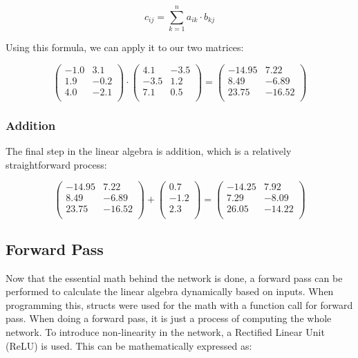 \[
c_{ij} = \sum_{k=1}^{n} a_{ik} \cdot b_{kj}
\]

Using this formula, we can apply it to our two matrices:

\[
\begin{pmatrix}
    -1.0 & 3.1 \\
    1.9 & -0.2 \\
    4.0 & -2.1 \\
\end{pmatrix}
\cdot
\begin{pmatrix}
    4.1 & -3.5\\
    -3.5 & 1.2\\
    7.1 & 0.5\\
\end{pmatrix}
=
\begin{pmatrix}
    -14.95 & 7.22\\
    8.49 & -6.89\\
    23.75 & -16.52\\
\end{pmatrix}
\]

\subsubsection*{Addition}

The final step in the linear algebra is addition, which is a relatively straightforward process:

\[
\begin{pmatrix}
    -14.95 & 7.22\\
    8.49 & -6.89\\
    23.75 & -16.52\\
\end{pmatrix}
+
\begin{pmatrix}
    0.7\\
    -1.2\\
    2.3\\
\end{pmatrix}
=
\begin{pmatrix}
    -14.25 & 7.92\\
    7.29 & -8.09\\
    26.05 & -14.22\\
\end{pmatrix}
\]

\subsection*{Forward Pass}

Now that the essential math behind the network is done, a forward pass can be performed to calculate the linear algebra dynamically based on inputs. When programming this, structs were used for the math with a function call for forward pass. When doing a forward pass, it is just a process of computing the whole network. To introduce non-linearity in the network, a Rectified Linear Unit (ReLU) is used. This can be mathematically expressed as:

